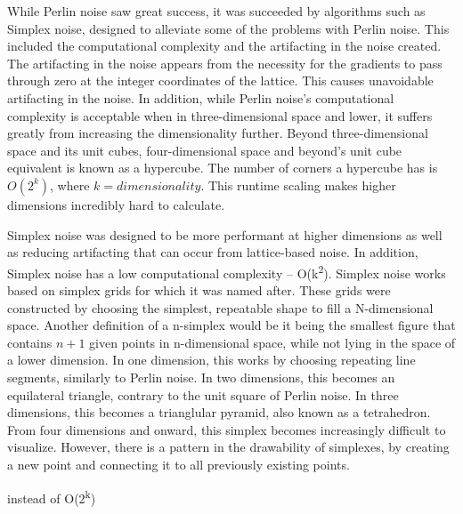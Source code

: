 \documentclass[10pt]{report}
\begin{document}
			While Perlin noise saw great success, it was succeeded by algorithms such as Simplex noise, designed to alleviate some of the problems with Perlin noise. This included the computational complexity and the artifacting in the noise created. The artifacting in the noise appears from the necessity for the gradients to pass through zero at the integer coordinates of the lattice. This causes unavoidable artifacting in the noise. In addition, while Perlin noise's computational complexity is acceptable when in three-dimensional space and lower, it suffers greatly from increasing the dimensionality further. Beyond three-dimensional space and its unit cubes, four-dimensional space and beyond's unit cube equivalent is known as a hypercube. The number of corners a hypercube has is \(O(2^k)\), where \(k = dimensionality\). This runtime scaling makes higher dimensions incredibly hard to calculate. 
			
			Simplex noise was designed to be more performant at higher dimensions as well as reducing artifacting that can occur from lattice-based noise. In addition, Simplex noise has a low computational complexity -- O(k\textsuperscript{2}). Simplex noise works based on simplex grids for which it was named after. These grids were constructed by choosing the simplest, repeatable shape to fill a N-dimensional space. Another definition of a n-simplex would be it being the smallest figure that contains \(n+1\) given points in n-dimensional space, while not lying in the space of a lower dimension. In one dimension, this works by choosing repeating line segments, similarly to Perlin noise. In two dimensions, this becomes an equilateral triangle, contrary to the unit square of Perlin noise. In three dimensions, this becomes a trianglular pyramid, also known as a tetrahedron. From four dimensions and onward, this simplex becomes increasingly difficult to visualize. However, there is a pattern in the drawability of simplexes, by creating a new point and connecting it to all previously existing points.
			
			 instead of O(2\textsuperscript{k})\cite{sheet-simplex}
			
\end{document}
